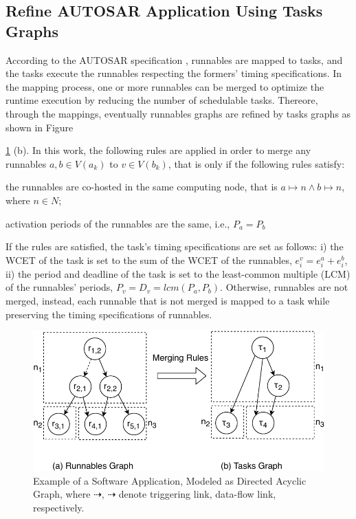 \subsection{Refine AUTOSAR Application Using Tasks Graphs}\label{subsec_autosar_system}
According to the AUTOSAR specification \cite{AUTOSAR2017SpecificationSoftware}, runnables are mapped to tasks, and the tasks execute the runnables respecting the formers' timing specifications. In the mapping process, one or more runnables can be merged to optimize the runtime execution by reducing the number of schedulable tasks. Thereore, through the mappings, eventually runnables graphs are refined by tasks graphs as shown in Figure~{\ref{fig_appexample} (b). In this work, the following rules are applied in order to merge any runnables $a,b\in V(a_k)$ to $v\in V(b_k)$, that is only if the following rules satisfy:
\begin{enumerate*}[label=(\roman*)]
	\item the runnables are co-hosted in the same computing node, that is $a\mapsto n \land b\mapsto n$, where $n\in N$;
	\item activation periods of the runnables are the same, i.e., $P_a = P_b$
\end{enumerate*}
	
If the rules are satisfied, the task's timing specifications are set as follows: i) the WCET of the task is set to the sum of the WCET of the runnables, $e_i^v=e_i^a + e_i^b$, ii) the period and deadline of the task is set to the least-common multiple (LCM) of the runnables' periods, $P_v=D_v=lcm(P_a, P_b)$. Otherwise, runnables are not merged, instead, each runnable that is not merged is mapped to a task while preserving the timing specifications of runnables.
\begin{figure}[h!]
	\centering
	\includegraphics[width=0.7\linewidth]{img/runnable_task_dag}
	\caption[Example of a Software Application.]{Example of a Software Application, Modeled as Directed Acyclic Graph, where $\dashrightarrow$, $\dashrightarrow$ denote triggering link, data-flow link, respectively.}
	\label{fig_appexample}
\end{figure}

}
